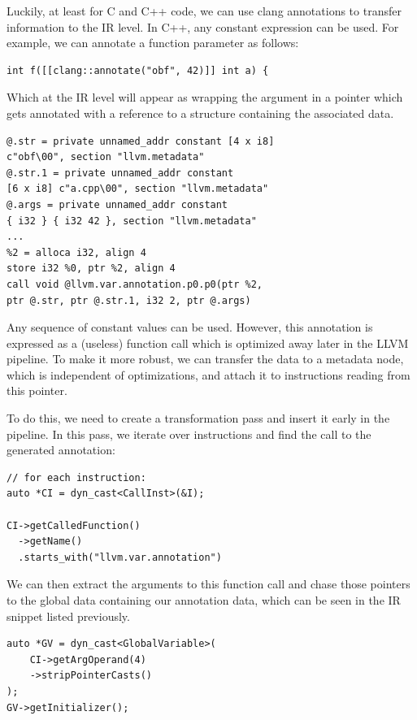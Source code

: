 \documentclass[twocolumn]{article}
\begin{document}
Luckily, at least for C and C++ code, we can use clang annotations to transfer information to the IR level. In C++, any constant expression can be used. For example, we can annotate a function parameter as follows:

\begin{verbatim}
int f([[clang::annotate("obf", 42)]] int a) {
\end{verbatim}

Which at the IR level will appear as wrapping the argument in a pointer which gets annotated with a reference to a structure containing the associated data.

\begin{verbatim}
@.str = private unnamed_addr constant [4 x i8]
c"obf\00", section "llvm.metadata"
@.str.1 = private unnamed_addr constant
[6 x i8] c"a.cpp\00", section "llvm.metadata"
@.args = private unnamed_addr constant
{ i32 } { i32 42 }, section "llvm.metadata"
...
%2 = alloca i32, align 4
store i32 %0, ptr %2, align 4
call void @llvm.var.annotation.p0.p0(ptr %2,
ptr @.str, ptr @.str.1, i32 2, ptr @.args)
\end{verbatim}

Any sequence of constant values can be used. However, this annotation is expressed as a (useless) function call which is optimized away later in the LLVM pipeline. To make it more robust, we can transfer the data to a metadata node, which is independent of optimizations, and attach it to instructions reading from this pointer. 

To do this, we need to create a transformation pass and insert it early in the pipeline. In this pass, we iterate over instructions and find the call to the generated annotation:


\begin{verbatim}
// for each instruction:
auto *CI = dyn_cast<CallInst>(&I);

CI->getCalledFunction()
  ->getName()
  .starts_with("llvm.var.annotation")
\end{verbatim}

We can then extract the arguments to this function call and chase those pointers to the global data containing our annotation data, which can be seen in the IR snippet listed previously.

\begin{verbatim}
auto *GV = dyn_cast<GlobalVariable>(
    CI->getArgOperand(4)
    ->stripPointerCasts()
);
GV->getInitializer();
\end{verbatim}
\end{document}
